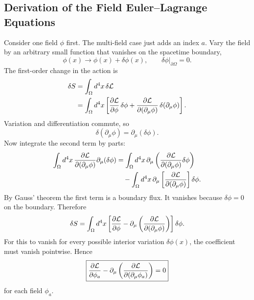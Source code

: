 \documentclass[../main.tex]{subfiles}
\begin{document}
\subsection{Derivation of the Field Euler--Lagrange Equations}
Consider one field $\phi$ first.  The multi-field case just adds an index $a$.
Vary the field by an arbitrary small function that vanishes on the spacetime
boundary,
\begin{equation}
  \phi(x)\longrightarrow \phi(x)+\delta\phi(x),
  \qquad \delta\phi\big|_{\partial\Omega}=0 .
\end{equation}
The first-order change in the action is
\begin{align}
  \delta S
  &=\int_\Omega d^4x\,\delta\mathcal L  \\
  &=\int_\Omega d^4x\left[
    \pdv{\mathcal L}{\phi}\,\delta\phi
    +\pdv{\mathcal L}{(\partial_\mu\phi)}\,\delta(\partial_\mu\phi)
  \right].
  \label{eq:lec23_delta_s_chain}
\end{align}
Variation and differentiation commute, so
\begin{equation}
  \delta(\partial_\mu\phi)=\partial_\mu(\delta\phi).
\end{equation}
Now integrate the second term by parts:
\begin{align}
  \int_\Omega d^4x\,
  \pdv{\mathcal L}{(\partial_\mu\phi)}\partial_\mu(\delta\phi)
  &=\int_\Omega d^4x\,\partial_\mu\left(
    \pdv{\mathcal L}{(\partial_\mu\phi)}\delta\phi\right) \\
  &\quad-\int_\Omega d^4x\,
    \partial_\mu\left[\pdv{\mathcal L}{(\partial_\mu\phi)}\right]\delta\phi .
\end{align}
By Gauss' theorem the first term is a boundary flux.  It vanishes because
$\delta\phi=0$ on the boundary.  Therefore
\begin{equation}
  \delta S=\int_\Omega d^4x\left[
    \pdv{\mathcal L}{\phi}
    -\partial_\mu\left(\pdv{\mathcal L}{(\partial_\mu\phi)}\right)
  \right]\delta\phi .
  \label{eq:lec23_delta_s_final}
\end{equation}
For this to vanish for every possible interior variation $\delta\phi(x)$, the
coefficient must vanish pointwise.  Hence
\begin{equation}
  \boxed{
  \pdv{\mathcal L}{\phi_a}
  -\partial_\mu\left(\pdv{\mathcal L}{(\partial_\mu\phi_a)}\right)=0
  }
  \label{eq:lec23_field_el}
\end{equation}
for each field $\phi_a$.

\end{document}
